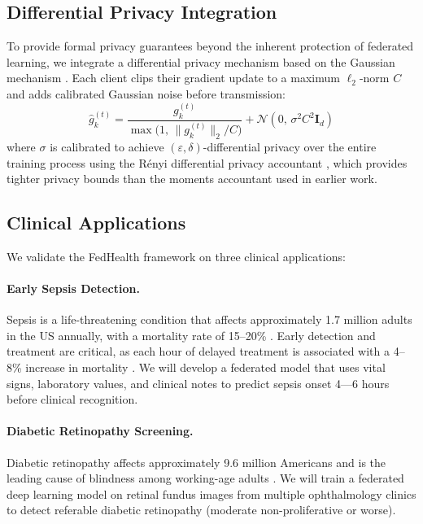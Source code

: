 \documentclass[12pt,letterpaper]{article}
\begin{document}
\subsection{Differential Privacy Integration}

To provide formal privacy guarantees beyond the inherent protection of federated learning, we integrate a differential privacy mechanism based on the Gaussian mechanism \citep{Dwork2014}. Each client clips their gradient update to a maximum $\ell_2$-norm $C$ and adds calibrated Gaussian noise before transmission:
\begin{equation}
\hat{g}_k^{(t)} = \frac{g_k^{(t)}}{\max\!\bigl(1,\, \|g_k^{(t)}\|_2 / C\bigr)} + \mathcal{N}(0,\, \sigma^2 C^2 \mathbf{I}_d)
\label{eq:dp}
\end{equation}
where $\sigma$ is calibrated to achieve $(\varepsilon, \delta)$-differential privacy over the entire training process using the R\'{e}nyi differential privacy accountant \citep{Mironov2017}, which provides tighter privacy bounds than the moments accountant used in earlier work.

\subsection{Clinical Applications}

We validate the FedHealth framework on three clinical applications:

\paragraph{Early Sepsis Detection.} Sepsis is a life-threatening condition that affects approximately 1.7 million adults in the US annually, with a mortality rate of 15--20\% \citep{CDC2024}. Early detection and treatment are critical, as each hour of delayed treatment is associated with a 4--8\% increase in mortality \citep{Kumar2006}. We will develop a federated model that uses vital signs, laboratory values, and clinical notes to predict sepsis onset 4---6 hours before clinical recognition.

\paragraph{Diabetic Retinopathy Screening.} Diabetic retinopathy affects approximately 9.6 million Americans and is the leading cause of blindness among working-age adults \citep{NEI2023}. We will train a federated deep learning model on retinal fundus images from multiple ophthalmology clinics to detect referable diabetic retinopathy (moderate non-proliferative or worse).
\end{document}
